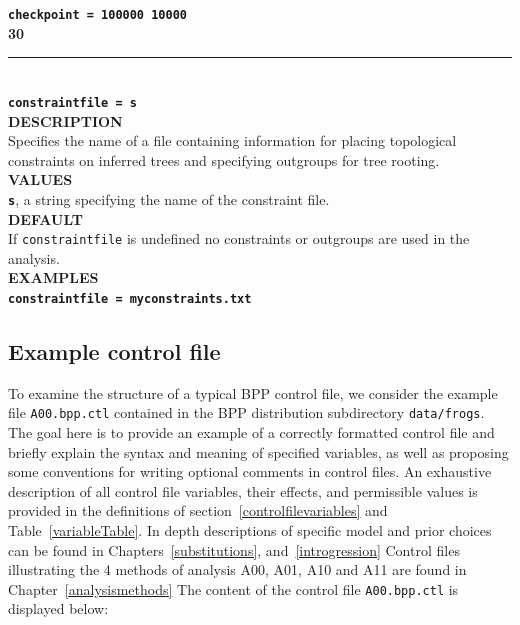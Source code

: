 \documentclass[a4paper]{book}
\numberwithin{equation}{section} \renewcommand{\baselinestretch}{0.55}
\begin{document}
\textbf{\texttt{checkpoint = 100000 10000}} \vspace{10pt}\\
\textbf{{\large 30}} \\
\noindent\rule{\textwidth}{0.8pt} \\
\textbf{{\Large \texttt{constraintfile = s}}} \vspace{5pt}\\
\textbf{DESCRIPTION} \vspace{5pt}\\
Specifies the name of a file containing information for placing
topological constraints on inferred trees and specifying outgroups for
tree rooting.
\vspace{5pt}\\
\textbf{VALUES} \vspace{5pt}\\
\textbf{\texttt{s}}, a string specifying the name of the constraint
file.
\vspace{5pt}\\
\textbf{DEFAULT} \vspace{5pt}\\
If \texttt{constraintfile} is undefined no constraints or outgroups
are used in the analysis.
\vspace{5pt}\\
\textbf{EXAMPLES} \vspace{5pt}\\
\textbf{\texttt{constraintfile = myconstraints.txt}} \vspace{5pt}\\

\subsection{Example control file} \label{examplecontrolfile}
To examine the structure of a typical BPP control file, we consider
the example file \texttt{A00.bpp.ctl} contained in the BPP
distribution subdirectory \texttt{data/frogs}.  The goal here is to
provide an example of a correctly formatted control file and briefly
explain the syntax and meaning of specified variables, as well as
proposing some conventions for writing optional comments in control
files.  An exhaustive description of all control file variables, their
effects, and permissible values is provided in the definitions of
section~\ref{controlfilevariables} and Table~\ref{variableTable}.  In
depth descriptions of specific model and prior choices can be found in
Chapters~\ref{substitutions}, and~\ref{introgression}  Control files illustrating the 4
methods of analysis A00, A01, A10 and A11 are found in
Chapter~\ref{analysismethods} The content of the control file
\texttt{A00.bpp.ctl} is displayed below:
\end{document}
